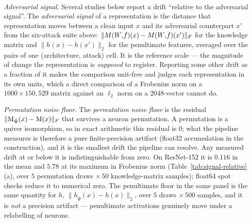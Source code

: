 \paragraph{}
\begin{clarifybox}
\emph{Adversarial signal.} Several studies below report a drift ``relative to
the adversarial signal''. The \emph{adversarial signal} of a representation is
the distance that representation moves between a clean input $x$ and its
adversarial counterpart $x'$ from the six-attack suite above:
$\|M(W{,}f)(x)-M(W{,}f)(x')\|_F$ for the knowledge matrix and $\|h(x)-h(x')\|_2$ for the
penultimate features, averaged over the pairs of one (architecture, attack)
cell. It is the reference scale --- the magnitude of change the representation
is \emph{supposed} to register. Reporting some other drift as a fraction of it
makes the comparison unit-free and judges each representation in its own units,
which a direct comparison of a Frobenius norm on a $1000\times150{,}529$ matrix
against an $\ell_2$ norm on a $2048$-vector cannot do.

\emph{Permutation noise floor.} The \emph{permutation noise floor} is the
residual $\|\mathrm{M}_{\tilde\Psi}(x)-\mathrm{M}(x)\|_F$ that survives a neuron permutation.
A permutation is a quiver isomorphism, so in exact arithmetic this residual is
$0$; what the pipeline measures is therefore a pure finite-precision artifact
(float32 accumulation in the construction), and it is the smallest drift the
pipeline can resolve. Any measured drift at or below it is indistinguishable
from zero. On ResNet-152 it is $0.116$ in the mean and $5.78$ at its maximum in
Frobenius norm (Table~\ref{tab:signal-relative}(a), over $5$ permutation draws
$\times\,50$ knowledge-matrix samples); float64 spot checks reduce it to
numerical zero. The penultimate floor in the same panel is the same quantity
for $h$, $\|h_{\tilde\Psi}(x)-h(x)\|_2$, over $5$ draws $\times\,500$ samples,
and it is \emph{not} a precision artifact --- penultimate activations genuinely
move under a relabelling of neurons.


\end{clarifybox}
